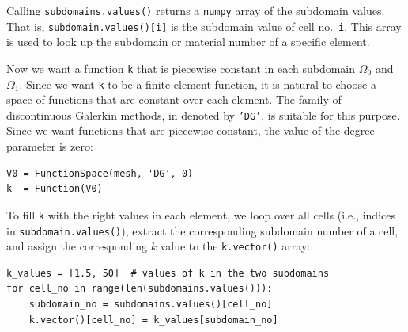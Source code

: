 Calling {\fontsize{12pt}{12pt}\texttt{subdomains.values()}} returns a {\fontsize{12pt}{12pt}\texttt{numpy}} array of the
subdomain values. That is, {\fontsize{12pt}{12pt}\texttt{subdomain.values()[i]}} is
the subdomain value of cell no.~{\fontsize{12pt}{12pt}\texttt{i}}. This array is used to
look up the subdomain or material number of a specific element.

Now we want a function {\fontsize{12pt}{12pt}\texttt{k}} that is piecewise constant in
each subdomain $\Omega_0$ and $\Omega_1$. Since we want {\fontsize{12pt}{12pt}\texttt{k}}
to be a finite element function, it is natural to choose
a space of functions that are constant over each element.
The family of discontinuous Galerkin methods, in \fenics{}
denoted by {\fontsize{12pt}{12pt}\texttt{'DG'}}, is suitable for this purpose. Since we
want functions that are piecewise constant, the value of
the degree parameter is zero:
\begin{Verbatim}[fontsize=\fontsize{10pt}{10pt},tabsize=8,baselinestretch=1.05,
fontfamily=tt,xleftmargin=7mm]
V0 = FunctionSpace(mesh, 'DG', 0)
k  = Function(V0)
\end{Verbatim}
\noindent
To fill {\fontsize{12pt}{12pt}\texttt{k}} with the right values in each element, we loop over
all cells (i.e., indices in {\fontsize{12pt}{12pt}\texttt{subdomain.values()}}),
extract the corresponding subdomain number of a cell,
and assign the corresponding $k$ value to the {\fontsize{12pt}{12pt}\texttt{k.vector()}} array:
\begin{Verbatim}[fontsize=\fontsize{10pt}{10pt},tabsize=8,baselinestretch=1.05,
fontfamily=tt,xleftmargin=7mm]
k_values = [1.5, 50]  # values of k in the two subdomains
for cell_no in range(len(subdomains.values())):
    subdomain_no = subdomains.values()[cell_no]
    k.vector()[cell_no] = k_values[subdomain_no]
\end{Verbatim}
\noindent


